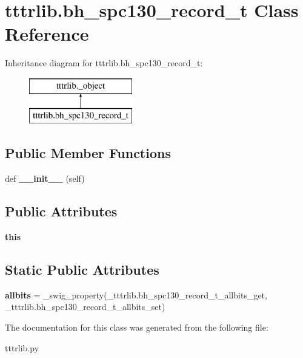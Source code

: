\hypertarget{classtttrlib_1_1bh__spc130__record__t}{}\section{tttrlib.\+bh\+\_\+spc130\+\_\+record\+\_\+t Class Reference}
\label{classtttrlib_1_1bh__spc130__record__t}
Inheritance diagram for tttrlib.\+bh\+\_\+spc130\+\_\+record\+\_\+t\+:\begin{figure}[H]
\begin{center}
\leavevmode
\includegraphics[height=2.000000cm]{classtttrlib_1_1bh__spc130__record__t}
\end{center}
\end{figure}
\subsection*{Public Member Functions}
\begin{DoxyCompactItemize}
\item 
\mbox{\label{classtttrlib_1_1bh__spc130__record__t_a090cb8ef30bc9b75abc9b71119beab82}} 
def {\bfseries \+\_\+\+\_\+init\+\_\+\+\_\+} (self)
\end{DoxyCompactItemize}
\subsection*{Public Attributes}
\begin{DoxyCompactItemize}
\item 
\mbox{\label{classtttrlib_1_1bh__spc130__record__t_a2fd7aec4e3735315a44ab49f37aca459}} 
{\bfseries this}
\end{DoxyCompactItemize}
\subsection*{Static Public Attributes}
\begin{DoxyCompactItemize}
\item 
\mbox{\label{classtttrlib_1_1bh__spc130__record__t_ac844624961c1c5cf197aae0bb26cc8fb}} 
{\bfseries allbits} = \+\_\+swig\+\_\+property(\+\_\+tttrlib.\+bh\+\_\+spc130\+\_\+record\+\_\+t\+\_\+allbits\+\_\+get, \+\_\+tttrlib.\+bh\+\_\+spc130\+\_\+record\+\_\+t\+\_\+allbits\+\_\+set)
\end{DoxyCompactItemize}


The documentation for this class was generated from the following file\+:\begin{DoxyCompactItemize}
\item 
tttrlib.\+py\end{DoxyCompactItemize}
